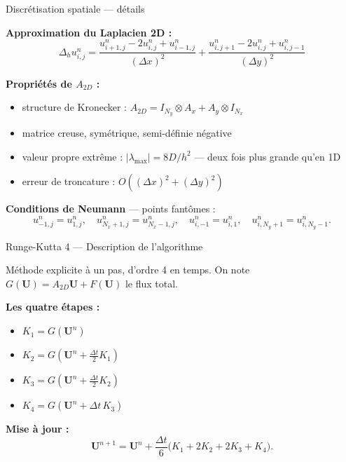 \documentclass[10pt]{beamer}
\begin{document}
\begin{frame}{Discrétisation spatiale — détails}

\textbf{Approximation du Laplacien 2D :}
\begin{equation}
  \Delta_h u_{i,j}^n =
  \frac{u_{i+1,j}^n - 2u_{i,j}^n + u_{i-1,j}^n}{(\Delta x)^2}
  + \frac{u_{i,j+1}^n - 2u_{i,j}^n + u_{i,j-1}^n}{(\Delta y)^2}
\end{equation}

\bigskip

\textbf{Propriétés de $A_{2D}$ :}

\begin{itemize}
  \item structure de Kronecker :
        $A_{2D} = I_{N_y} \otimes A_x + A_y \otimes I_{N_x}$
  \item matrice creuse, symétrique, semi-définie négative
  \item valeur propre extrême : $|\lambda_{\max}| = 8D/h^2$
        — deux fois plus grande qu'en 1D
  \item erreur de troncature : $O\!\left((\Delta x)^2 + (\Delta y)^2\right)$
\end{itemize}

\bigskip

\textbf{Conditions de Neumann} — points fantômes :
\begin{equation}
  u_{-1,j}^n = u_{1,j}^n, \quad
  u_{N_x+1,j}^n = u_{N_x-1,j}^n, \quad
  u_{i,-1}^n = u_{i,1}^n, \quad
  u_{i,N_y+1}^n = u_{i,N_y-1}^n.
\end{equation}

\end{frame}

\begin{frame}{Runge-Kutta 4 — Description de l'algorithme}

Méthode explicite à un pas, d'ordre 4 en temps. On note
$G(\mathbf{U}) = A_{2D}\mathbf{U} + F(\mathbf{U})$ le flux total.

\bigskip

\textbf{Les quatre étapes :}

\begin{itemize}
  \item $K_1 = G(\mathbf{U}^n)$
  \item $K_2 = G\!\left(\mathbf{U}^n + \tfrac{\Delta t}{2}K_1\right)$
  \item $K_3 = G\!\left(\mathbf{U}^n + \tfrac{\Delta t}{2}K_2\right)$
  \item $K_4 = G\!\left(\mathbf{U}^n + \Delta t\, K_3\right)$
\end{itemize}

\bigskip

\textbf{Mise \`a jour :}
\begin{equation}
  \boxed{\mathbf{U}^{n+1} = \mathbf{U}^n
    + \frac{\Delta t}{6}\bigl(K_1 + 2K_2 + 2K_3 + K_4\bigr).}
\end{equation}

\end{frame}
\end{document}
